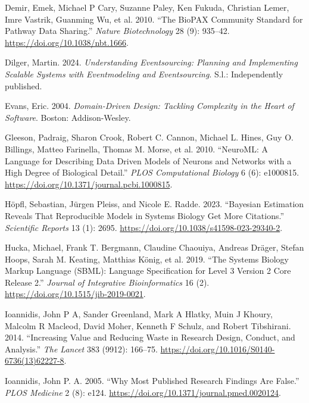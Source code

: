 \documentclass[
  a4paper,
]{scrartcl}
\newlength{\cslhangindent}
\newenvironment{CSLReferences}[2] %
 {\begin{list}{}{%
  \setlength{\itemindent}{0pt}
  \setlength{\leftmargin}{0pt}
  \setlength{\parsep}{0pt}
  \ifodd #1
   \setlength{\leftmargin}{\cslhangindent}
   \setlength{\itemindent}{-1\cslhangindent}
  \fi
  \setlength{\itemsep}{#2\baselineskip}}}
 {\end{list}}
\begin{document}
\begin{CSLReferences}{1}{0}
Demir, Emek, Michael P Cary, Suzanne Paley, Ken Fukuda, Christian Lemer,
Imre Vastrik, Guanming Wu, et al. 2010. {``The {BioPAX} Community
Standard for Pathway Data Sharing.''} \emph{Nature Biotechnology} 28
(9): 935--42. \url{https://doi.org/10.1038/nbt.1666}.

Dilger, Martin. 2024. \emph{Understanding {Eventsourcing}: {Planning}
and {Implementing} Scalable {Systems} with {Eventmodeling} and
{Eventsourcing}}. S.l.: Independently published.

Evans, Eric. 2004. \emph{Domain-Driven Design: Tackling Complexity in
the Heart of Software}. Boston: Addison-Wesley.

Gleeson, Padraig, Sharon Crook, Robert C. Cannon, Michael L. Hines, Guy
O. Billings, Matteo Farinella, Thomas M. Morse, et al. 2010.
{``{NeuroML}: {A} {Language} for {Describing} {Data} {Driven} {Models}
of {Neurons} and {Networks} with a {High} {Degree} of {Biological}
{Detail}.''} \emph{PLOS Computational Biology} 6 (6): e1000815.
\url{https://doi.org/10.1371/journal.pcbi.1000815}.

Höpfl, Sebastian, Jürgen Pleiss, and Nicole E. Radde. 2023. {``Bayesian
Estimation Reveals That Reproducible Models in {Systems} {Biology} Get
More Citations.''} \emph{Scientific Reports} 13 (1): 2695.
\url{https://doi.org/10.1038/s41598-023-29340-2}.

Hucka, Michael, Frank T. Bergmann, Claudine Chaouiya, Andreas Dräger,
Stefan Hoops, Sarah M. Keating, Matthias König, et al. 2019. {``The
{Systems} {Biology} {Markup} {Language} ({SBML}): {Language}
{Specification} for {Level} 3 {Version} 2 {Core} {Release} 2.''}
\emph{Journal of Integrative Bioinformatics} 16 (2).
\url{https://doi.org/10.1515/jib-2019-0021}.

Ioannidis, John P A, Sander Greenland, Mark A Hlatky, Muin J Khoury,
Malcolm R Macleod, David Moher, Kenneth F Schulz, and Robert Tibshirani.
2014. {``Increasing Value and Reducing Waste in Research Design,
Conduct, and Analysis.''} \emph{The Lancet} 383 (9912): 166--75.
\url{https://doi.org/10.1016/S0140-6736(13)62227-8}.

Ioannidis, John P. A. 2005. {``Why {Most} {Published} {Research}
{Findings} {Are} {False}.''} \emph{PLOS Medicine} 2 (8): e124.
\url{https://doi.org/10.1371/journal.pmed.0020124}.


\end{CSLReferences}
\end{document}
